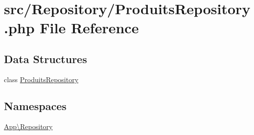 \hypertarget{_produits_repository_8php}{}\section{src/\+Repository/\+Produits\+Repository.php File Reference}
\label{_produits_repository_8php}
\subsection*{Data Structures}
\begin{DoxyCompactItemize}
\item 
class \mbox{\hyperlink{class_app_1_1_repository_1_1_produits_repository}{Produits\+Repository}}
\end{DoxyCompactItemize}
\subsection*{Namespaces}
\begin{DoxyCompactItemize}
\item 
 \mbox{\hyperlink{namespace_app_1_1_repository}{App\textbackslash{}\+Repository}}
\end{DoxyCompactItemize}

